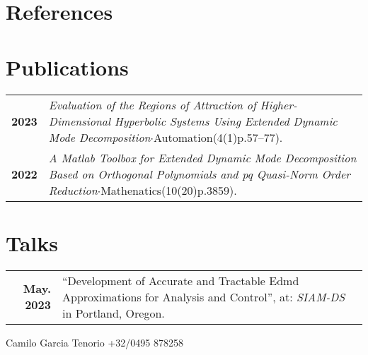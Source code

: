 \documentclass[11pt,a4paper,grey]{hipstercv}
\newlength{\rightcolwidth}
\begin{document}
\begin{paracol}{2}
\begin{minipage}[t]{0.3\textwidth}
\section*{References}
\end{minipage}\hfill
\begin{minipage}[t]{0.3\textwidth}
\section*{Publications}
\begin{tabular}{>{\footnotesize\bfseries}r >{\footnotesize}p{}}
    2023 & \emph{Evaluation of the Regions of Attraction of Higher-Dimensional Hyperbolic Systems Using Extended Dynamic Mode Decomposition}$\cdot$Automation(4(1)p.57--77). \\
    2022 & \emph{A Matlab Toolbox for Extended Dynamic Mode Decomposition Based on Orthogonal Polynomials and pq Quasi-Norm Order Reduction}$\cdot$Mathenatics(10(20)p.3859).
\end{tabular}
\section*{Talks}
\begin{tabular}{>{\footnotesize\bfseries}r >{\footnotesize}p{}}
    May. 2023 & ``Development of Accurate and Tractable Edmd Approximations for Analysis and Control'', at: \emph{SIAM-DS} in Portland, Oregon.
\end{tabular}
\end{minipage}









\vfill{} %

\setlength{\parindent}{0pt}
\begin{minipage}[t]{\rightcolwidth}
\begin{center}\fontfamily{\sfdefault}\selectfont \color{black!70}
	{\small Camilo Garcia Tenorio\href{mailto:camilo_7@msn.com}{} \href{https://www.linkedin.com/in/camilo-garcia-tenorio-08813740/}{} \href{https://github.com/garten-cam}{} +32/0495 878258}
\end{center}
\end{minipage}


\end{paracol}
\end{document}
